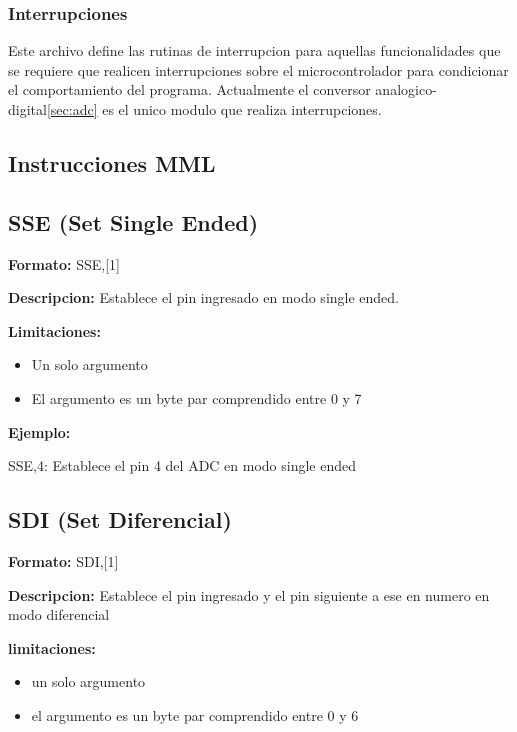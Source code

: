 \documentclass{article}
\theoremstyle{definition}
\theoremstyle{remark}
\begin{document}
\subsubsection{Interrupciones}
Este archivo define las rutinas de interrupcion para aquellas funcionalidades que se requiere que realicen interrupciones sobre el microcontrolador para condicionar el comportamiento del programa. Actualmente el conversor analogico-digital\ref{sec:adc} es el unico modulo que realiza interrupciones.


\clearpage
\appendix
\begin{appendices}
   \addappheadtotoc
   \appendixpage


\section{Instrucciones MML}\label{ap:instrucciones}

\subsection{SSE (Set Single Ended)}

\textbf{Formato:} SSE,[1]

\textbf{Descripcion:}
Establece el pin ingresado en modo single ended.

\textbf{Limitaciones:}
\begin{itemize}
  \item Un solo argumento
  \item El argumento es un byte par comprendido entre 0 y 7
\end{itemize}

\textbf{Ejemplo:}

SSE,4: Establece el pin 4 del ADC en modo single ended

\subsection{SDI (Set Diferencial)}

\textbf{Formato:} SDI,[1]

\textbf{Descripcion:}
Establece el pin ingresado y el pin siguiente a ese en numero en modo diferencial

\textbf{limitaciones:}
\begin{itemize}
  \item un solo argumento
  \item el argumento es un byte par comprendido entre 0 y 6
\end{itemize}


\end{appendices}
\end{document}
